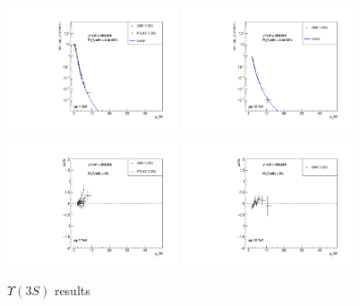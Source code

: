 \documentclass{article}
\begin{document}
\begin{figure}
\centering
\includegraphics[width = 0.45\textwidth]{ups3S_cs.pdf}
\includegraphics[width = 0.45\textwidth]{ups3S_cs_13.pdf}

\includegraphics[width = 0.45\textwidth]{ups3S_pull.pdf}
\includegraphics[width = 0.45\textwidth]{ups3S_pull_13.pdf}
\caption{$\Upsilon(3S)$ results}
\end{figure}

\clearpage


\end{document}
